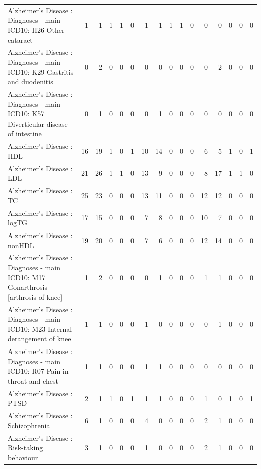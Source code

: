 \begin{table}[ht]
\begin{tabular}{lrrrrrrrrrrrrrrr}
  Alzheimer's Disease : Diagnoses - main ICD10: H26 Other cataract &   1 &   1 &   1 &   1 &   0 &   1 &   1 &   1 &   1 &   0 &   0 &   0 &   0 &   0 &   0 \\ 
  Alzheimer's Disease : Diagnoses - main ICD10: K29 Gastritis and duodenitis &   0 &   2 &   0 &   0 &   0 &   0 &   0 &   0 &   0 &   0 &   0 &   2 &   0 &   0 &   0 \\ 
  Alzheimer's Disease : Diagnoses - main ICD10: K57 Diverticular disease of intestine &   0 &   1 &   0 &   0 &   0 &   0 &   1 &   0 &   0 &   0 &   0 &   0 &   0 &   0 &   0 \\ 
  Alzheimer's Disease : HDL &  16 &  19 &   1 &   0 &   1 &  10 &  14 &   0 &   0 &   0 &   6 &   5 &   1 &   0 &   1 \\ 
  Alzheimer's Disease : LDL &  21 &  26 &   1 &   1 &   0 &  13 &   9 &   0 &   0 &   0 &   8 &  17 &   1 &   1 &   0 \\ 
  Alzheimer's Disease : TC &  25 &  23 &   0 &   0 &   0 &  13 &  11 &   0 &   0 &   0 &  12 &  12 &   0 &   0 &   0 \\ 
  Alzheimer's Disease : logTG &  17 &  15 &   0 &   0 &   0 &   7 &   8 &   0 &   0 &   0 &  10 &   7 &   0 &   0 &   0 \\ 
  Alzheimer's Disease : nonHDL &  19 &  20 &   0 &   0 &   0 &   7 &   6 &   0 &   0 &   0 &  12 &  14 &   0 &   0 &   0 \\ 
  Alzheimer's Disease : Diagnoses - main ICD10: M17 Gonarthrosis [arthrosis of knee] &   1 &   2 &   0 &   0 &   0 &   0 &   1 &   0 &   0 &   0 &   1 &   1 &   0 &   0 &   0 \\ 
  Alzheimer's Disease : Diagnoses - main ICD10: M23 Internal derangement of knee &   1 &   1 &   0 &   0 &   0 &   1 &   0 &   0 &   0 &   0 &   0 &   1 &   0 &   0 &   0 \\ 
  Alzheimer's Disease : Diagnoses - main ICD10: R07 Pain in throat and chest &   1 &   1 &   0 &   0 &   0 &   1 &   1 &   0 &   0 &   0 &   0 &   0 &   0 &   0 &   0 \\ 
  Alzheimer's Disease : PTSD &   2 &   1 &   1 &   0 &   1 &   1 &   1 &   0 &   0 &   0 &   1 &   0 &   1 &   0 &   1 \\ 
  Alzheimer's Disease : Schizophrenia &   6 &   1 &   0 &   0 &   0 &   4 &   0 &   0 &   0 &   0 &   2 &   1 &   0 &   0 &   0 \\ 
  Alzheimer's Disease : Risk-taking behaviour &   3 &   1 &   0 &   0 &   0 &   1 &   0 &   0 &   0 &   0 &   2 &   1 &   0 &   0 &   0 \\ 

\end{tabular}
\end{table}
